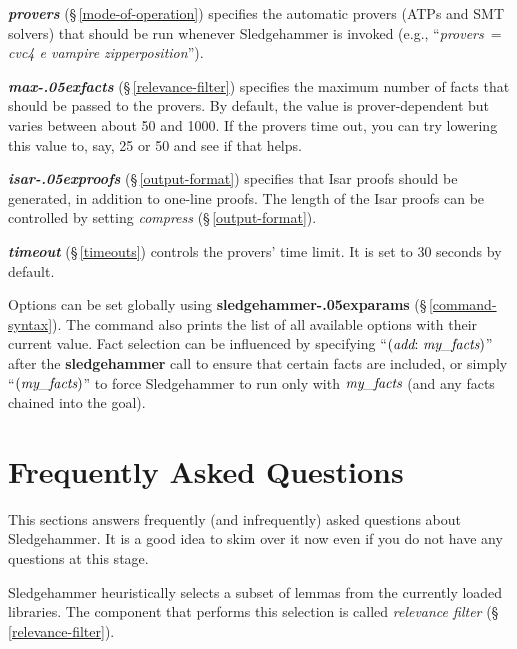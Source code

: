 \documentclass[a4paper,12pt]{article}
\let\oldS=\S
\def\S{\oldS\,}
\renewcommand\_{\hbox{\textunderscore\kern-.05ex}}
\begin{document}
\begin{enum}
\item[\labelitemi] \textbf{\textit{provers}} (\S\ref{mode-of-operation}) specifies
the automatic provers (ATPs and SMT solvers) that should be run whenever
Sledgehammer is invoked (e.g., ``\textit{provers}~= \textit{cvc4 e
vampire zipperposition\/}'').

\item[\labelitemi] \textbf{\textit{max\_facts}} (\S\ref{relevance-filter})
specifies the maximum number of facts that should be passed to the provers. By
default, the value is prover-dependent but varies between about 50 and 1000. If
the provers time out, you can try lowering this value to, say, 25 or 50 and see
if that helps.

\item[\labelitemi] \textbf{\textit{isar\_proofs}} (\S\ref{output-format}) specifies
that Isar proofs should be generated, in addition to one-line proofs. The length
of the Isar proofs can be controlled by setting \textit{compress}
(\S\ref{output-format}).

\item[\labelitemi] \textbf{\textit{timeout}} (\S\ref{timeouts}) controls the
provers' time limit. It is set to 30 seconds by default.
\end{enum}

Options can be set globally using \textbf{sledgehammer\_params}
(\S\ref{command-syntax}). The command also prints the list of all available
options with their current value. Fact selection can be influenced by specifying
``$(\textit{add}{:}~\textit{my\_facts})$'' after the \textbf{sledgehammer} call
to ensure that certain facts are included, or simply ``$(\textit{my\_facts})$''
to force Sledgehammer to run only with $\textit{my\_facts}$ (and any facts
chained into the goal).


\section{Frequently Asked Questions}
\label{frequently-asked-questions}

This sections answers frequently (and infrequently) asked questions about
Sledgehammer. It is a good idea to skim over it now even if you do not have any
questions at this stage.



Sledgehammer heuristically selects a subset of lemmas from the currently loaded
libraries. The component that performs this selection is called \emph{relevance
filter} (\S\ref{relevance-filter}).
\end{document}
